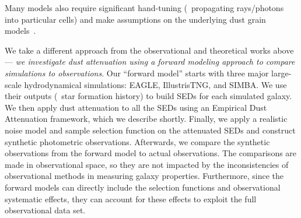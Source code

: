 Many models also require significant hand-tuning (\eg~propagating rays/photons into
particular cells) and make assumptions on the underlying dust grain models~\citep[see][for a review]{steinacker2013}. 

We take a different approach from the observational and theoretical works
above --- \emph{we investigate dust attenuation using a forward modeling
approach to compare simulations to observations}.
Our ``forward model'' starts with three major large-scale hydrodynamical
simulations: EAGLE, IllustrisTNG, and SIMBA. 
We use their outputs (\eg~star formation history) to build SEDs for each
simulated galaxy.
We then apply dust attenuation to all the SEDs using an Empirical Dust
Attenuation framework, which we describe shortly.
Finally, we apply a realistic noise model and sample selection function on
the attenuated SEDs and construct synthetic photometric observations. 
Afterwards, we compare the synthetic observations from the forward model to
actual observations. 
The comparisons are made in observational space, so they are not impacted
by the inconsistencies of observational methods in measuring galaxy
properties.
Furthermore, since the forward models can directly include the selection
functions and observational systematic effects, they can account for these
effects to exploit the full observational data set.

